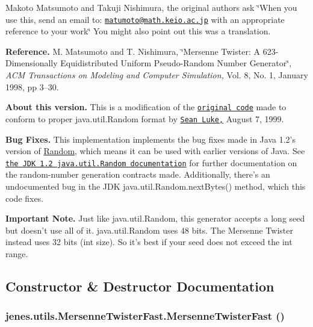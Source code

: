 Makoto Matsumoto and Takuji Nishimura, the original authors ask \char`\"{}When you use this, send an email to: \href{mailto:matumoto@math.keio.ac.jp}{\tt matumoto@math.keio.ac.jp} with an appropriate reference to your work\char`\"{} You might also point out this was a translation. 

{\bf Reference. } M. Matsumoto and T. Nishimura, \char`\"{}Mersenne Twister: A 623-Dimensionally Equidistributed Uniform Pseudo-Random Number Generator\char`\"{}, {\em ACM Transactions on Modeling and Computer Simulation,\/} Vol. 8, No. 1, January 1998, pp 3--30.

{\bf About this version. } This is a modification of the \href{http://www.theorem.com/java/index.htm#Mersenne}{\tt original code} made to conform to proper java.util.Random format by \href{http://www.cs.umd.edu/users/seanl/}{\tt Sean Luke,} August 7, 1999.

{\bf Bug Fixes. }This implementation implements the bug fixes made in Java 1.2's version of \hyperlink{classjenes_1_1utils_1_1_random}{Random}, which means it can be used with earlier versions of Java. See \href{http://www.javasoft.com/products/jdk/1.2/docs/api/java/util/Random.html}{\tt the JDK 1.2 java.util.Random documentation} for further documentation on the random-number generation contracts made. Additionally, there's an undocumented bug in the JDK java.util.Random.nextBytes() method, which this code fixes.

{\bf Important Note. } Just like java.util.Random, this generator accepts a long seed but doesn't use all of it. java.util.Random uses 48 bits. The Mersenne Twister instead uses 32 bits (int size). So it's best if your seed does not exceed the int range. 

\subsection{Constructor \& Destructor Documentation}
\hypertarget{classjenes_1_1utils_1_1_mersenne_twister_fast_7321af0f92bcda7c245ebfbb647f7e4c}{
\subsubsection[MersenneTwisterFast]{\setlength{\rightskip}{0pt plus 5cm}jenes.utils.MersenneTwisterFast.MersenneTwisterFast ()}}
\label{classjenes_1_1utils_1_1_mersenne_twister_fast_7321af0f92bcda7c245ebfbb647f7e4c}


